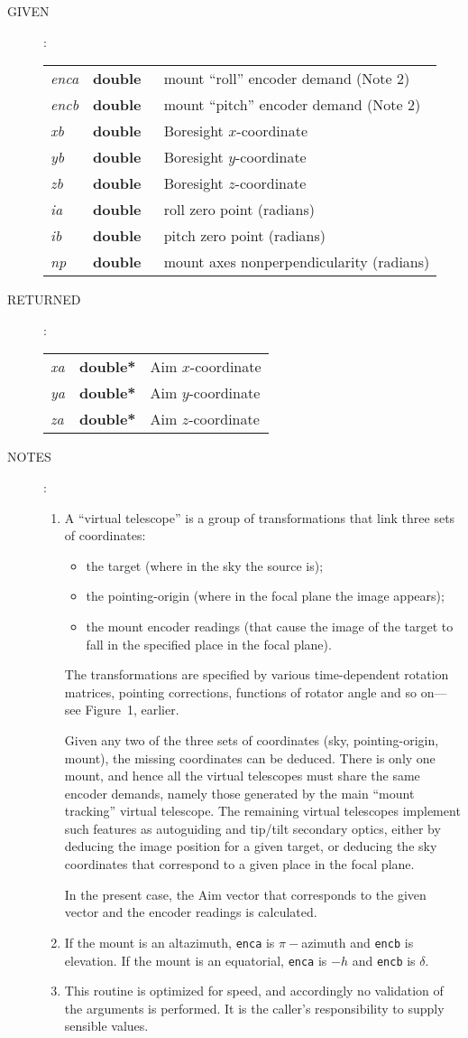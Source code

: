 \documentclass[12pt,fleqn,twoside]{article}
\renewcommand{\_}{{\tt\char'137}}     %
\newcommand{\args}[2]
{
  \goodbreak
  \begin{description}
  \item[#1]: \\[1.5ex] \nopagebreak
    \hspace*{-0.9em}
    \begin{tabular}{p{4.5em}p{5.8em}p{23.5em}}
      #2
    \end{tabular}
  \end{description}
  \vspace{-3ex}
}
\newcommand{\spec}[3]
{
  {\em {#1}} & {\bf \mbox{#2}} & {#3}
}
\newcommand{\notes}[1]
{
  \goodbreak
  \begin{description}
    \item[NOTES]: \nopagebreak
        #1
  \end{description}
  \vspace{-3ex}
}
\begin{document}
\args{GIVEN}
{
\spec{enca}{double }{mount ``roll'' encoder demand (Note 2)} \\
\spec{encb}{double }{mount ``pitch'' encoder demand (Note 2)} \\
\spec{xb}{double}{{\sc Boresight} $x$-coordinate} \\
\spec{yb}{double}{{\sc Boresight} $y$-coordinate} \\
\spec{zb}{double}{{\sc Boresight} $z$-coordinate} \\
\spec{ia}{double}{roll zero point (radians)} \\
\spec{ib}{double}{pitch zero point (radians)} \\
\spec{np}{double}{mount axes nonperpendicularity (radians)}
}
\args{RETURNED}
{
\spec{xa}{double*}{{\sc Aim} $x$-coordinate} \\
\spec{ya}{double*}{{\sc Aim} $y$-coordinate} \\
\spec{za}{double*}{{\sc Aim} $z$-coordinate}
}
\notes{
\begin{enumerate}
\setlength{\parskip}{\medskipamount}
\item A ``virtual telescope'' is a group of transformations that link
      three sets of coordinates:
      \begin{itemize}
      \item the target (where in the sky the source is);
      \item the pointing-origin (where in the focal plane the image
            appears);
      \item the mount encoder readings (that cause the image of the
            target to fall in the specified place in the focal plane).
      \end{itemize}
      The transformations are specified by various time-dependent
      rotation matrices, pointing corrections, functions of rotator
      angle and so on---see Figure~1, earlier.

      Given any two of the three sets of coordinates
      (sky, pointing-origin, mount), the missing coordinates
      can be deduced.  There is
      only one mount, and hence all the virtual telescopes must share
      the same encoder demands, namely those generated by the main
      ``mount tracking'' virtual telescope.  The remaining virtual
      telescopes implement such features as autoguiding and tip/tilt
      secondary optics, either by deducing the image position for a
      given target, or deducing the sky coordinates that correspond to
      a given place in the focal plane.

      In the present case, the {\sc Aim} vector
      that corresponds to the given {\sc {\sc Boresight}} vector and
      the encoder readings is calculated.
\item If the mount is an altazimuth, {\tt enca} is $\pi-$azimuth
      and {\tt encb} is elevation.  If the mount is an equatorial,
      {\tt enca} is $-h$ and {\tt encb} is $\delta$.
\item This routine is optimized for speed, and accordingly no validation
      of the arguments is performed.  It is the caller's responsibility
      to supply sensible values.
\end{enumerate}
}
\end{document}
